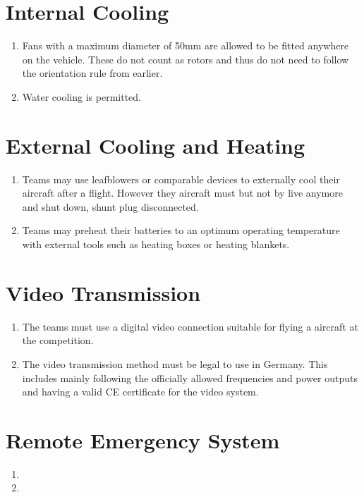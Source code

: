 \documentclass{article}
\begin{document}
\section{Internal Cooling}
\begin{enumerate}
  \item Fans with a maximum diameter of 50mm are allowed to be fitted anywhere on the vehicle. These do not count as rotors and thus do not need to follow the orientation rule from earlier.
  \item Water cooling is permitted. 
\end{enumerate}

\section{External Cooling and Heating}
\begin{enumerate}
  \item Teams may use leafblowers or comparable devices to externally cool their aircraft after a flight. However they aircraft must but not by live anymore and shut down, shunt plug disconnected.  
  \item Teams may preheat their batteries to an optimum operating temperature with external tools such as heating boxes or heating blankets.
\end{enumerate}

\section{Video Transmission}
\begin{enumerate}
  \item The teams must use a digital video connection suitable for flying a aircraft at the competition.  
  \item The video transmission method must be legal to use in Germany. This includes mainly following the officially allowed frequencies and power outputs and having a valid CE certificate for the video system.
\end{enumerate}


\section{Remote Emergency System}
\begin{enumerate}
  \item 
  \item 
\end{enumerate}
\end{document}
